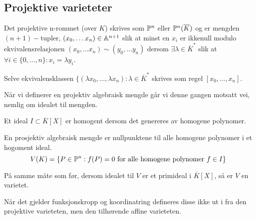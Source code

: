 \subsection{Projektive varieteter}
\begin{definisjon}
Det projektive n-rommet (over $K$) skrives som $\mathbb{P} ^n$ eller $\mathbb{P}^n(\overline{K})$ og er mengden $(n+1)-$tupler, $(x_0, \ldots x_n) \in \mathbb{A} ^{n+1}$ slik at minst en $x_i$ er ikkenull modulo ekvivalensrelasjonen $(x_0, \ldots x_n) \sim (y_0, \ldots y_n)$ dersom $\exists \lambda \in \overline{K}^*$ slik at $\forall i \in \{0, \ldots, n\}: x_i = \lambda y_i$. 

Selve ekvivalensklassen $\{(\lambda x_0, \ldots, \lambda x_n): \lambda \in \overline{K}^*$ skrives som regel $[x_0, \ldots, x_n]$.
\end{definisjon}
Når vi definerer en projektiv algebraisk mengde går vi denne gangen motsatt vei, nemlig om idealet til mengden. 
\begin{definisjon}
Et ideal $I \subset \overline{K}[X]$ er homogent dersom det genereres av homogene polynomer. 
\end{definisjon}
\begin{definisjon}
En prosjektiv algebraisk mengde er nullpunktene til alle homogene polynomer i et hogoment ideal. $$V(K) = \{P \in \mathbb{P}^n : f(P) = 0 \text{ for alle homogene polynomer } f \in I\}$$
\end{definisjon}
På samme måte som før, dersom idealet til $V$ er et primideal i $\overline{K}[X]$, så er $V$ en varietet.

Når det gjelder funksjonskropp og koordinatring defineres disse ikke ut i fra den projektive varieteten, men den tilhørende affine varieteten.